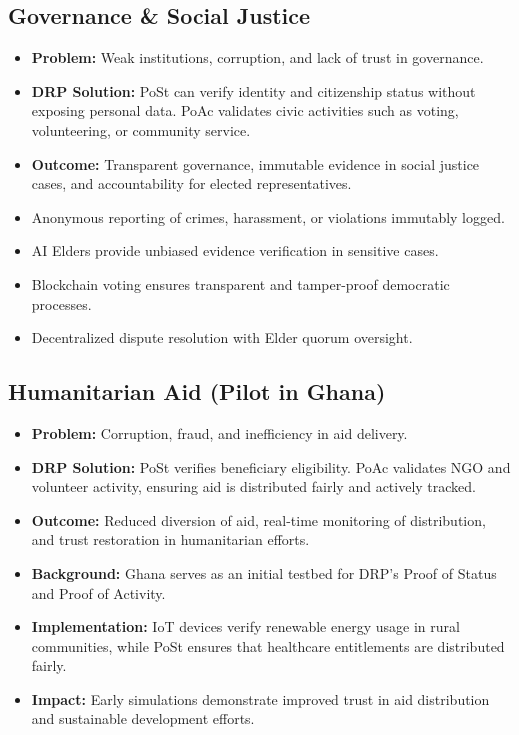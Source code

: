 \documentclass[11pt,a4paper]{article}
\begin{document}
\subsection{Governance \& Social Justice}
\begin{itemize}
    \item \textbf{Problem:} Weak institutions, corruption, and lack of trust in governance.
    \item \textbf{DRP Solution:} PoSt can verify identity and citizenship status without exposing personal data. PoAc validates civic activities such as voting, volunteering, or community service.
    \item \textbf{Outcome:} Transparent governance, immutable evidence in social justice cases, and accountability for elected representatives.
    \item Anonymous reporting of crimes, harassment, or violations immutably logged.
    \item AI Elders provide unbiased evidence verification in sensitive cases.
    \item Blockchain voting ensures transparent and tamper-proof democratic processes.
    \item Decentralized dispute resolution with Elder quorum oversight.
\end{itemize}

\subsection{Humanitarian Aid (Pilot in Ghana)}
\begin{itemize}
    \item \textbf{Problem:} Corruption, fraud, and inefficiency in aid delivery.
    \item \textbf{DRP Solution:} PoSt verifies beneficiary eligibility. PoAc validates NGO and volunteer activity, ensuring aid is distributed fairly and actively tracked.
    \item \textbf{Outcome:} Reduced diversion of aid, real-time monitoring of distribution, and trust restoration in humanitarian efforts.
    \item \textbf{Background:} Ghana serves as an initial testbed for DRP's Proof of Status and Proof of Activity.
    \item \textbf{Implementation:} IoT devices verify renewable energy usage in rural communities, while PoSt ensures that healthcare entitlements are distributed fairly.
    \item \textbf{Impact:} Early simulations demonstrate improved trust in aid distribution and sustainable development efforts.
\end{itemize}
\end{document}

